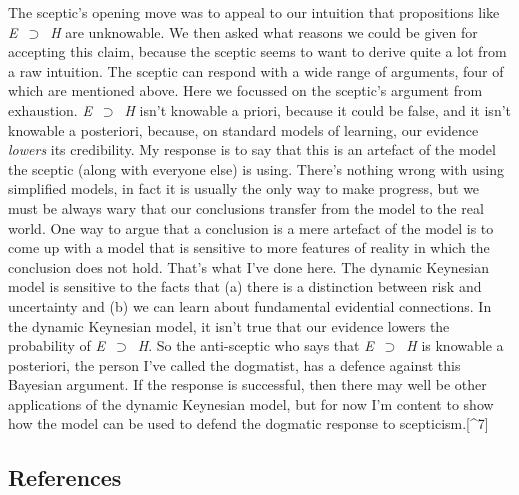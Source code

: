 \documentclass[
  11pt,
  letterpaper,
  DIV=11,
  numbers=noendperiod,
  oneside]{scrartcl}
\begin{document}
The sceptic's opening move was to appeal to our intuition that
propositions like \emph{E}~\({\supset}\)~\emph{H} are unknowable. We
then asked what reasons we could be given for accepting this claim,
because the sceptic seems to want to derive quite a lot from a raw
intuition. The sceptic can respond with a wide range of arguments, four
of which are mentioned above. Here we focussed on the sceptic's argument
from exhaustion. \emph{E}~\({\supset}\)~\emph{H} isn't knowable a
priori, because it could be false, and it isn't knowable a posteriori,
because, on standard models of learning, our evidence \emph{lowers} its
credibility. My response is to say that this is an artefact of the model
the sceptic (along with everyone else) is using. There's nothing wrong
with using simplified models, in fact it is usually the only way to make
progress, but we must be always wary that our conclusions transfer from
the model to the real world. One way to argue that a conclusion is a
mere artefact of the model is to come up with a model that is sensitive
to more features of reality in which the conclusion does not hold.
That's what I've done here. The dynamic Keynesian model is sensitive to
the facts that (a) there is a distinction between risk and uncertainty
and (b) we can learn about fundamental evidential connections. In the
dynamic Keynesian model, it isn't true that our evidence lowers the
probability of \emph{E}~\({\supset}\)~\emph{H}. So the anti-sceptic who
says that \emph{E}~\({\supset}\)~\emph{H} is knowable a posteriori, the
person I've called the dogmatist, has a defence against this Bayesian
argument. If the response is successful, then there may well be other
applications of the dynamic Keynesian model, but for now I'm content to
show how the model can be used to defend the dogmatic response to
scepticism.{[}\^{}7{]}

\subsection*{References}\label{references}
\end{document}
